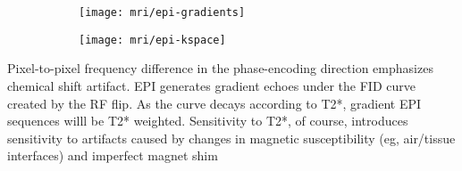 \documentclass[a4paper,11pt]{article}
\begin{document}
\begin{figure}
\begin{subfigure}{0.5\textwidth}
\texttt{[image: mri/epi-gradients]}
\caption{}
\label{fig:epi-gradients}
\end{subfigure}
\begin{subfigure}{0.5\textwidth}
\texttt{[image: mri/epi-kspace]}
\caption{}
\label{}
\end{subfigure}
\caption{}
\label{fig:epi}
\end{figure}


Pixel-to-pixel frequency difference in the phase-encoding direction emphasizes chemical shift artifact.
EPI generates gradient echoes under the FID curve created by the RF flip. As the curve decays according to T2*, gradient EPI sequences willl be T2* weighted.
Sensitivity to T2*, of course, introduces sensitivity to artifacts caused by changes in magnetic susceptibility (eg, air/tissue interfaces) and imperfect magnet shim







\end{document}
